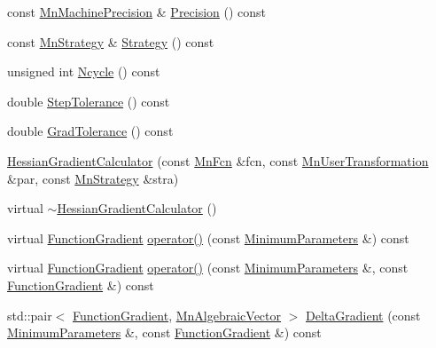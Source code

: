 \begin{DoxyCompactItemize}
\item 
const \mbox{\hyperlink{classROOT_1_1Minuit2_1_1MnMachinePrecision}{Mn\+Machine\+Precision}} \& \mbox{\hyperlink{classROOT_1_1Minuit2_1_1HessianGradientCalculator_afeacc0589b4f4d6a1e6e6b985f24cc3b}{Precision}} () const
\item 
const \mbox{\hyperlink{classROOT_1_1Minuit2_1_1MnStrategy}{Mn\+Strategy}} \& \mbox{\hyperlink{classROOT_1_1Minuit2_1_1HessianGradientCalculator_a407171e2df12fa67e92c0e5b7a97bb8d}{Strategy}} () const
\item 
unsigned int \mbox{\hyperlink{classROOT_1_1Minuit2_1_1HessianGradientCalculator_a234641f72296f007b2d95b514be07138}{Ncycle}} () const
\item 
double \mbox{\hyperlink{classROOT_1_1Minuit2_1_1HessianGradientCalculator_ac66592218817d4cbc8a3be76938b435d}{Step\+Tolerance}} () const
\item 
double \mbox{\hyperlink{classROOT_1_1Minuit2_1_1HessianGradientCalculator_a17febf33fcbeafa556e703d8bbe3d1db}{Grad\+Tolerance}} () const
\item 
\mbox{\hyperlink{classROOT_1_1Minuit2_1_1HessianGradientCalculator_af298f780f59cb2be1ac5e676af07f82b}{Hessian\+Gradient\+Calculator}} (const \mbox{\hyperlink{classROOT_1_1Minuit2_1_1MnFcn}{Mn\+Fcn}} \&fcn, const \mbox{\hyperlink{classROOT_1_1Minuit2_1_1MnUserTransformation}{Mn\+User\+Transformation}} \&par, const \mbox{\hyperlink{classROOT_1_1Minuit2_1_1MnStrategy}{Mn\+Strategy}} \&stra)
\item 
virtual \mbox{\hyperlink{classROOT_1_1Minuit2_1_1HessianGradientCalculator_abb91fad11c0bbff5199e4da1f03b1fb3}{$\sim$\+Hessian\+Gradient\+Calculator}} ()
\item 
virtual \mbox{\hyperlink{classROOT_1_1Minuit2_1_1FunctionGradient}{Function\+Gradient}} \mbox{\hyperlink{classROOT_1_1Minuit2_1_1HessianGradientCalculator_af65e43d99c763df00e3d082d59a7a24d}{operator()}} (const \mbox{\hyperlink{classROOT_1_1Minuit2_1_1MinimumParameters}{Minimum\+Parameters}} \&) const
\item 
virtual \mbox{\hyperlink{classROOT_1_1Minuit2_1_1FunctionGradient}{Function\+Gradient}} \mbox{\hyperlink{classROOT_1_1Minuit2_1_1HessianGradientCalculator_af6fed0f29a33ec23f97451562d41cfaa}{operator()}} (const \mbox{\hyperlink{classROOT_1_1Minuit2_1_1MinimumParameters}{Minimum\+Parameters}} \&, const \mbox{\hyperlink{classROOT_1_1Minuit2_1_1FunctionGradient}{Function\+Gradient}} \&) const
\item 
std\+::pair$<$ \mbox{\hyperlink{classROOT_1_1Minuit2_1_1FunctionGradient}{Function\+Gradient}}, \mbox{\hyperlink{namespaceROOT_1_1Minuit2_a62ed97730a1ca8d3fbaec64a19aa11c9}{Mn\+Algebraic\+Vector}} $>$ \mbox{\hyperlink{classROOT_1_1Minuit2_1_1HessianGradientCalculator_a808c1f808c436fbb6b67cb8af13d0480}{Delta\+Gradient}} (const \mbox{\hyperlink{classROOT_1_1Minuit2_1_1MinimumParameters}{Minimum\+Parameters}} \&, const \mbox{\hyperlink{classROOT_1_1Minuit2_1_1FunctionGradient}{Function\+Gradient}} \&) const

\end{DoxyCompactItemize}
